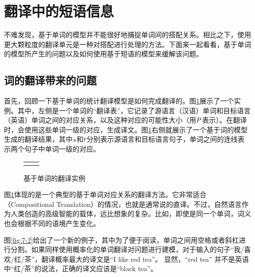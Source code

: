 \section{翻译中的短语信息}

不难发现，基于单词的模型并不能很好地捕捉单词间的搭配关系。相比之下，使用更大颗粒度的翻译单元是一种对搭配进行处理的方法。下面来一起看看，基于单词的模型所产生的问题以及如何使用基于短语的模型来缓解该问题。


\subsection{词的翻译带来的问题}

\parinterval 首先，回顾一下基于单词的统计翻译模型是如何完成翻译的。图\ref{fig:7-1}展示了一个实例。其中，左侧是一个单词的“翻译表”，它记录了源语言（汉语）单词和目标语言（英语）单词之间的对应关系，以及这种对应的可能性大小（用${P}$表示）。在翻译时，会使用这些单词一级的对应，生成译文。图\ref{fig:7-1}右侧就展示了一个基于词的模型生成的翻译结果，其中${s}$和${t}$分别表示源语言和目标语言句子，单词之间的连线表示两个句子中单词一级的对应。

\begin{figure}[htp]
\centering
\begin{tabular}{l r}
\subfigure{} & \subfigure{} \\
\end{tabular}
\caption{基于单词的翻译实例}
\label{fig:7-1}
\end{figure}

\parinterval 图\ref{fig:7-1}体现的是一个典型的基于单词对应关系的翻译方法。它非常适合{\small{}}（Compositional Translation）的情况，也就是通常说的直译。不过，自然语言作为人类创造的高级智能的载体，远比想象的复杂。比如，即使是同一个单词，词义也会根据不同的语境产生变化。

\parinterval 图\ref{fig:7-2}给出了一个新的例子，其中为了便于阅读，单词之间用空格或者斜杠进行分割。如果同样使用概率化的单词翻译对问题进行建模，对于输入的句子“我/喜欢/红/茶”，翻译概率最大的译文是“I like red tea”。 显然，“red tea” 并不是英语中“红/茶”的说法，正确的译文应该是“black tea”。

